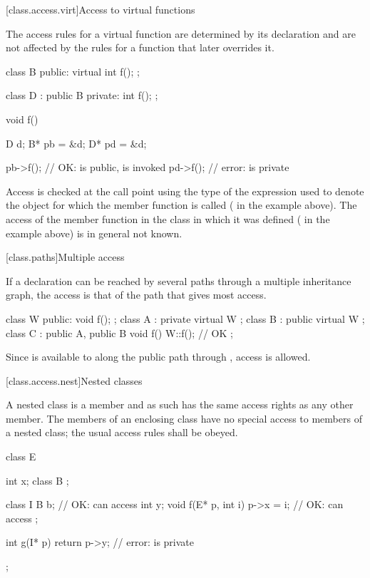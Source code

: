 [class.access.virt]{Access to virtual functions}%

\pnum
The access rules for a virtual function are determined by its declaration
and are not affected by the rules for a function that later overrides it.
\begin{example}
\begin{codeblock}
class B {
public:
  virtual int f();
};

class D : public B {
private:
  int f();
};

void f() {
  D d;
  B* pb = &d;
  D* pd = &d;

  pb->f();                      // OK:  is public,  is invoked
  pd->f();                      // error:  is private
}
\end{codeblock}
\end{example}

\pnum
Access is checked at the call point using the type of the expression used
to denote the object for which the member function is called
(
in the example above).
The access of the member function in the class in which it was defined
(
in the example above) is in general not known.

[class.paths]{Multiple access}%

\pnum
If a declaration can be reached by several paths through a multiple inheritance
graph, the access is that of the path that gives most access.
\begin{example}
\begin{codeblock}
class W { public: void f(); };
class A : private virtual W { };
class B : public virtual W { };
class C : public A, public B {
  void f() { W::f(); }          // OK
};
\end{codeblock}

Since
is available to
along the public path through
,
access is allowed.
\end{example}

[class.access.nest]{Nested classes}%
%

\pnum
A nested class is a member and as such has the same access rights as any other member.
The members of an enclosing class have no special access to members of a nested
class; the usual access rules shall be obeyed.
\begin{example}
\begin{codeblock}
class E {
  int x;
  class B { };

  class I {
    B b;                        // OK:  can access 
    int y;
    void f(E* p, int i) {
      p->x = i;                 // OK:  can access 
    }
  };

  int g(I* p) {
    return p->y;                // error:  is private
  }
};
\end{codeblock}
\end{example}

